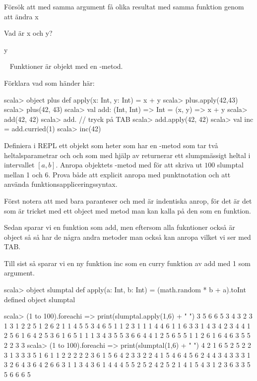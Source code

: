 \SubtaskSolved  Försök att med samma argument få olika resultat med samma funktion genom att ändra x

\SubtaskSolved  Vad är x och y?

\SubtaskSolved  y



\QUESTEND





\QUESTBEGIN

\Task  \what~ Funktioner är objekt med en -metod.

\Subtask Förklara vad som händer här:
\begin{REPL}
scala> object plus { def apply(x: Int, y: Int) = x + y }
scala> plus.apply(42,43)
scala> plus(42, 43)
scala> val add: (Int, Int) => Int = (x, y) => x + y
scala> add(42, 42)
scala> add.   // tryck på TAB
scala> add.apply(42, 42)
scala> val inc = add.curried(1)
scala> inc(42)
\end{REPL}

\Subtask Definiera i REPL ett objekt som heter  som har en -metod som tar två heltalsparametrar  och  och som med hjälp av  returnerar ett slumpmässigt heltal i intervallet $[a, b]$. Anropa objektets -metod med  för att skriva ut $100$ slumptal mellan 1 och 6. Prova både att explicit anropa  med punktnotation och att använda funktionsappliceringssyntax.



\SOLUTION


\TaskSolved \what


\SubtaskSolved
Först notera att  med bara paranteser och med  är indentiska anrop, för det är det som är tricket med ett object med  metod man kan kalla på den som en funktion.

Sedan sparar vi en funktion som add, men eftersom alla fukntioner också är object så så har de några andra metoder man också kan anropa vilket vi ser med TAB.

Till sist så sparar vi en ny funktion inc som en curry funktion av add med 1 som argument.

\SubtaskSolved
\begin{REPL}
scala> object slumptal{ def apply(a: Int, b: Int) = (math.random * b + a).toInt }
defined object slumptal

scala> (1 to 100).foreach{i => print(slumptal.apply(1,6) + " ")}
3 5 6 6 5 3 4 3 2 3 1 3 1 2 2 5 1 2 6 2 1 1 4 5 5 3 4 6 5 1 1 2 3 1 1 1 4 4 6 1 1 6 3 3 1 4 3 4 2 3 4 4 1 2 5 6 1 6 4 2 5 3 6 1 6 5 1 1 1 3 4 3 5 5 3 6 6 4 4 1 2 5 6 5 5 1 1 2 6 1 6 4 6 3 5 5 2 2 3 3
scala> (1 to 100).foreach{i => print(slumptal(1,6) + " ")}
4 2 1 6 5 2 5 2 2 3 1 3 3 3 5 1 6 1 1 2 2 2 2 2 3 6 1 5 6 4 2 3 3 2 2 4 1 5 4 6 4 5 6 2 4 4 3 4 3 3 3 1 3 2 6 4 3 6 4 2 6 6 3 1 1 3 4 3 6 1 4 4 4 5 5 2 5 2 4 2 5 2 1 4 1 5 4 3 1 2 3 6 3 3 5 5 6 6 6 5

\end{REPL}



